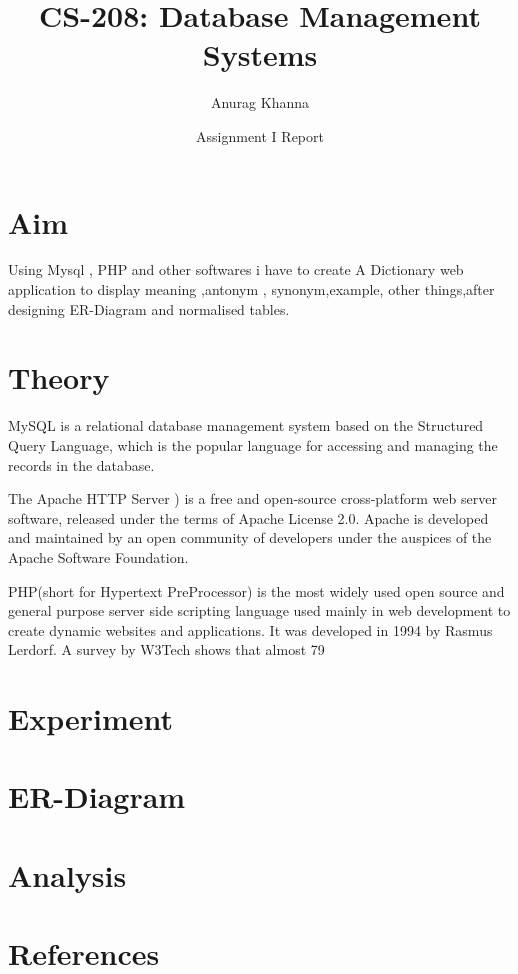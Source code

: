 \documentclass[twocolumn,11pt]{article}
\title{CS-208: Database Management Systems}
\author{Anurag Khanna}
\date{Assignment I Report}
\begin{document}
	\pagestyle{plain}
	
	\section*{Aim}
	Using Mysql , PHP and other softwares i have to create A Dictionary web application to display meaning ,antonym , synonym,example, other things,after designing ER-Diagram and normalised tables.
	
	\section*{Theory}
	MySQL is a relational database management system based on the Structured Query Language, which is the popular language for accessing and managing the records in the database.
	
	The Apache HTTP Server ) is a free and open-source cross-platform web server software, released under the terms of Apache License 2.0. Apache is developed and maintained by an open community of developers under the auspices of the Apache Software Foundation.

    PHP(short for Hypertext PreProcessor) is the most widely used open source and general purpose server side scripting language used mainly in web development to create dynamic websites and applications. It was developed in 1994 by Rasmus Lerdorf. A survey by W3Tech shows that almost 79%
	
	\section*{Experiment}
   
    \section*{ER-Diagram}
	
	\section*{Analysis}

	
	\section*{References}
\end{document}
